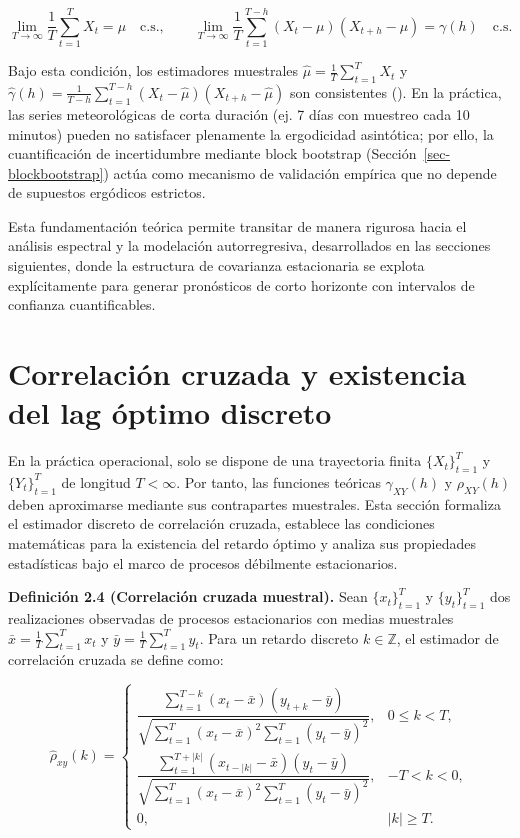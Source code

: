 \documentclass[
  spanish,
  us-letterpaper,
]{scrreprt}
\numberwithin{equation}{section}
\begin{document}
\[
\lim_{T \to \infty} \frac{1}{T} \sum_{t=1}^{T} X_t = \mu \quad \text{c.s.}, \qquad 
\lim_{T \to \infty} \frac{1}{T} \sum_{t=1}^{T-h} (X_t - \mu)(X_{t+h} - \mu) = \gamma(h) \quad \text{c.s.}
\]

Bajo esta condición, los estimadores muestrales
\(\hat{\mu} = \frac{1}{T}\sum_{t=1}^T X_t\) y
\(\hat{\gamma}(h) = \frac{1}{T-h}\sum_{t=1}^{T-h} (X_t-\hat{\mu})(X_{t+h}-\hat{\mu})\)
son consistentes ().
En la práctica, las series meteorológicas de corta duración (ej. 7 días
con muestreo cada 10 minutos) pueden no satisfacer plenamente la
ergodicidad asintótica; por ello, la cuantificación de incertidumbre
mediante block bootstrap (Sección~\ref{sec-blockbootstrap}) actúa como
mecanismo de validación empírica que no depende de supuestos ergódicos
estrictos.

Esta fundamentación teórica permite transitar de manera rigurosa hacia
el análisis espectral y la modelación autorregresiva, desarrollados en
las secciones siguientes, donde la estructura de covarianza estacionaria
se explota explícitamente para generar pronósticos de corto horizonte
con intervalos de confianza cuantificables.

\section{Correlación cruzada y existencia del lag óptimo
discreto}\label{sec-correlacioncruzada}

En la práctica operacional, solo se dispone de una trayectoria finita
\(\{X_t\}_{t=1}^T\) y \(\{Y_t\}_{t=1}^T\) de longitud \(T < \infty\).
Por tanto, las funciones teóricas \(\gamma_{XY}(h)\) y \(\rho_{XY}(h)\)
deben aproximarse mediante sus contrapartes muestrales. Esta sección
formaliza el estimador discreto de correlación cruzada, establece las
condiciones matemáticas para la existencia del retardo óptimo y analiza
sus propiedades estadísticas bajo el marco de procesos débilmente
estacionarios.

\textbf{Definición 2.4 (Correlación cruzada muestral).} Sean
\(\{x_t\}_{t=1}^T\) y \(\{y_t\}_{t=1}^T\) dos realizaciones observadas
de procesos estacionarios con medias muestrales
\(\bar{x} = \frac{1}{T}\sum_{t=1}^T x_t\) y
\(\bar{y} = \frac{1}{T}\sum_{t=1}^T y_t\). Para un retardo discreto
\(k \in \mathbb{Z}\), el estimador de correlación cruzada se define
como:

\[
\hat{\rho}_{xy}(k) = 
\begin{cases}
\dfrac{\sum_{t=1}^{T-k} (x_t - \bar{x})(y_{t+k} - \bar{y})}{\sqrt{\sum_{t=1}^T (x_t - \bar{x})^2 \sum_{t=1}^T (y_t - \bar{y})^2}}, & 0 \leq k < T, \\[12pt]
\dfrac{\sum_{t=1}^{T+|k|} (x_{t-|k|} - \bar{x})(y_t - \bar{y})}{\sqrt{\sum_{t=1}^T (x_t - \bar{x})^2 \sum_{t=1}^T (y_t - \bar{y})^2}}, & -T < k < 0, \\[12pt]
0, & |k| \geq T.
\end{cases}
\]
\end{document}
